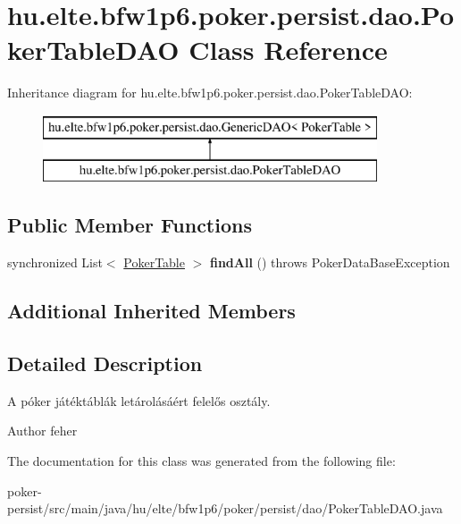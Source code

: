 \hypertarget{classhu_1_1elte_1_1bfw1p6_1_1poker_1_1persist_1_1dao_1_1_poker_table_d_a_o}{}\section{hu.\+elte.\+bfw1p6.\+poker.\+persist.\+dao.\+Poker\+Table\+D\+A\+O Class Reference}
\label{classhu_1_1elte_1_1bfw1p6_1_1poker_1_1persist_1_1dao_1_1_poker_table_d_a_o}
Inheritance diagram for hu.\+elte.\+bfw1p6.\+poker.\+persist.\+dao.\+Poker\+Table\+D\+A\+O\+:\begin{figure}[H]
\begin{center}
\leavevmode
\includegraphics[height=2.000000cm]{classhu_1_1elte_1_1bfw1p6_1_1poker_1_1persist_1_1dao_1_1_poker_table_d_a_o}
\end{center}
\end{figure}
\subsection*{Public Member Functions}
\begin{DoxyCompactItemize}
\item 
\hypertarget{classhu_1_1elte_1_1bfw1p6_1_1poker_1_1persist_1_1dao_1_1_poker_table_d_a_o_ac9ee1da2b8a438acfa4582a53029051c}{}synchronized List$<$ \hyperlink{classhu_1_1elte_1_1bfw1p6_1_1poker_1_1model_1_1entity_1_1_poker_table}{Poker\+Table} $>$ {\bfseries find\+All} ()  throws Poker\+Data\+Base\+Exception \label{classhu_1_1elte_1_1bfw1p6_1_1poker_1_1persist_1_1dao_1_1_poker_table_d_a_o_ac9ee1da2b8a438acfa4582a53029051c}

\end{DoxyCompactItemize}
\subsection*{Additional Inherited Members}


\subsection{Detailed Description}
A póker játéktáblák letárolásáért felelős osztály. \begin{DoxyAuthor}{Author}
feher 
\end{DoxyAuthor}


The documentation for this class was generated from the following file\+:\begin{DoxyCompactItemize}
\item 
poker-\/persist/src/main/java/hu/elte/bfw1p6/poker/persist/dao/Poker\+Table\+D\+A\+O.\+java\end{DoxyCompactItemize}
